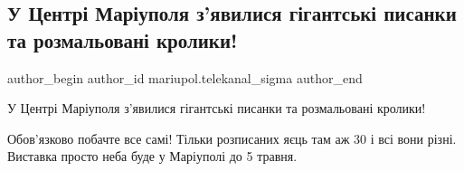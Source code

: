  
 
 
 
 
 
\subsection{У Центрі Маріуполя з'явилися гігантські писанки та розмальовані кролики!}
\label{sec:26_04_2019.fb.mariupol.telekanal_sigma.1.centr_gigantski_pysanky_krolyky}
 
\ifcmt
 author_begin
   author_id mariupol.telekanal_sigma
 author_end
\fi

У Центрі Маріуполя з'явилися гігантські писанки та розмальовані кролики!

Обов'язково побачте все самі! Тільки розписаних яєць там аж 30 і всі вони
різні. Виставка просто неба буде у Маріуполі до 5 травня.

